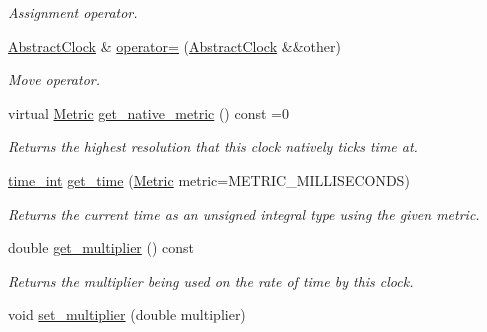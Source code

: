 \begin{DoxyCompactItemize}
\begin{DoxyCompactList}\small\item\em Assignment operator. \end{DoxyCompactList}\item 
\hypertarget{classomi_1_1runtime_1_1_abstract_clock_ae7b8a8d919d194d1fa063cbce5772d1e}{}\hyperlink{classomi_1_1runtime_1_1_abstract_clock}{Abstract\+Clock} \& \hyperlink{classomi_1_1runtime_1_1_abstract_clock_ae7b8a8d919d194d1fa063cbce5772d1e}{operator=} (\hyperlink{classomi_1_1runtime_1_1_abstract_clock}{Abstract\+Clock} \&\&other)\label{classomi_1_1runtime_1_1_abstract_clock_ae7b8a8d919d194d1fa063cbce5772d1e}

\begin{DoxyCompactList}\small\item\em Move operator. \end{DoxyCompactList}\item 
\hypertarget{classomi_1_1runtime_1_1_abstract_clock_aeacac367a243c33b773b8b06933b1f7b}{}virtual \hyperlink{classomi_1_1runtime_1_1_abstract_clock_a6af6e30a02165469ffcdcbd512d47a1b}{Metric} \hyperlink{classomi_1_1runtime_1_1_abstract_clock_aeacac367a243c33b773b8b06933b1f7b}{get\+\_\+native\+\_\+metric} () const  =0\label{classomi_1_1runtime_1_1_abstract_clock_aeacac367a243c33b773b8b06933b1f7b}

\begin{DoxyCompactList}\small\item\em Returns the highest resolution that this clock natively ticks time at. \end{DoxyCompactList}\item 
\hypertarget{classomi_1_1runtime_1_1_abstract_clock_ab504674ae140328a3a4dd3a2b02b89c8}{}\hyperlink{classomi_1_1runtime_1_1_abstract_clock_af2122541388aea885afc08e8135340f7}{time\+\_\+int} \hyperlink{classomi_1_1runtime_1_1_abstract_clock_ab504674ae140328a3a4dd3a2b02b89c8}{get\+\_\+time} (\hyperlink{classomi_1_1runtime_1_1_abstract_clock_a6af6e30a02165469ffcdcbd512d47a1b}{Metric} metric=M\+E\+T\+R\+I\+C\+\_\+\+M\+I\+L\+L\+I\+S\+E\+C\+O\+N\+D\+S)\label{classomi_1_1runtime_1_1_abstract_clock_ab504674ae140328a3a4dd3a2b02b89c8}

\begin{DoxyCompactList}\small\item\em Returns the current time as an unsigned integral type using the given metric. \end{DoxyCompactList}\item 
double \hyperlink{classomi_1_1runtime_1_1_abstract_clock_a2e4f50f159a450e7f57692c9425f6821}{get\+\_\+multiplier} () const 
\begin{DoxyCompactList}\small\item\em Returns the multiplier being used on the rate of time by this clock. \end{DoxyCompactList}\item 
\hypertarget{classomi_1_1runtime_1_1_abstract_clock_a7d6ea5465b61ada67327f0fbb5fb01d2}{}void \hyperlink{classomi_1_1runtime_1_1_abstract_clock_a7d6ea5465b61ada67327f0fbb5fb01d2}{set\+\_\+multiplier} (double multiplier)\label{classomi_1_1runtime_1_1_abstract_clock_a7d6ea5465b61ada67327f0fbb5fb01d2}


\end{DoxyCompactItemize}

